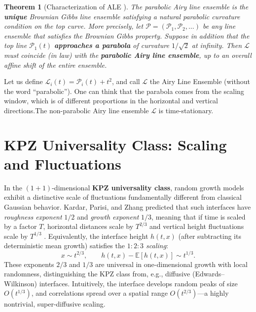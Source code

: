 \documentclass[letterpaper,11pt,oneside,reqno]{article}
\numberwithin{equation}{section}
\newtheorem{theorem}[proposition]{Theorem}
\theoremstyle{definition}
\begin{document}
\begin{theorem}[Characterization of ALE \cite{AggarwalHuang2023Characterization}]
	The parabolic Airy line ensemble is the \textbf{unique} Brownian Gibbs line ensemble satisfying a natural parabolic curvature condition on the top curve. More precisely, let $\boldsymbol{\mathcal{P}}=(\mathcal{P}_1,\mathcal{P}_2,\ldots)$ be any line ensemble that satisfies the Brownian Gibbs property. Suppose in addition that the top line $\mathcal{P}_1(t)$ \textbf{approaches a parabola} of curvature $1/\sqrt{2}$ at infinity. Then $\boldsymbol{\mathcal{L}}$ must coincide (in law) with the \textbf{parabolic Airy line ensemble}, up to an overall affine shift of the entire ensemble.
\end{theorem}

Let us define $\mathcal{L}_i(t)=\mathcal{P}_i(t)+t^2$, and
call $\mathcal{L}$ the Airy Line Ensemble
(without the word ``parabolic''). One can think that the parabola comes
from the scaling window, which is of different proportions
in the horizontal and vertical directions.The non-parabolic
Airy line ensemble $\mathcal{L}$ is time-stationary.


\section{KPZ Universality Class: Scaling and Fluctuations}

In the $(1+1)$-dimensional \textbf{KPZ universality class}, random growth models exhibit a distinctive scale of fluctuations fundamentally different from classical Gaussian behavior. Kardar, Parisi, and Zhang \cite{KPZ1986} predicted that such interfaces have \emph{roughness exponent} $1/2$ and \emph{growth exponent} $1/3$, meaning that if time is scaled by a factor $T$, horizontal distances scale by $T^{2/3}$ and vertical height fluctuations scale by $T^{1/3}$ \cite{remenik2023integrable}. Equivalently, the interface height $h(t,x)$ (after subtracting its deterministic mean growth) satisfies the \emph{$1:2:3$ scaling}:
\[ x \sim t^{2/3}, \qquad h(t,x)-\mathbb{E}[h(t,x)] \sim t^{1/3}. \]
These exponents $2/3$ and $1/3$ are universal in one-dimensional growth with local randomness, distinguishing the KPZ class from, e.g., diffusive (Edwards–Wilkinson) interfaces. Intuitively, the interface develops random peaks of size $O(t^{1/3})$, and correlations spread over a spatial range $O(t^{2/3})$—a highly nontrivial, super-diffusive scaling.
\end{document}
